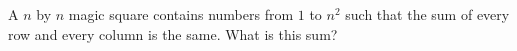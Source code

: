 A $n$ by $n$ magic square contains numbers from $1$ to $n^2$ such that the sum of every row and every column is the same. What is this sum?